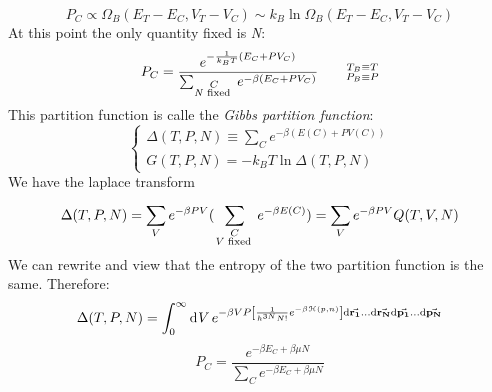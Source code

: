 \documentclass[../main/main.tex]{subfiles}
\begin{document}
\begin{equation}
  P_C \propto \Omega _B (E_T-E_C, V_T-V_C) \sim k_B \ln{\Omega _B (E_T-E_C, V_T-V_C)}
  \label{eq:}
\end{equation}
At this point the only quantity fixed is \emph{N}:
\begin{equation}
  P_C = \frac{e^{-\frac{1}{k_B T} (E_C + P V_C)} }{\sum_{\substack{ C \\  \text{\emph{N} fixed } } }^{} e^{-\beta (E_C + P V_C)}   } \qquad \substack{T_B \equiv T \\ P_B \equiv P}
  \label{eq:}
\end{equation}
This partition function is calle the \emph{Gibbs partition function}:
\begin{equation}
  \begin{cases}
   \Delta (T,P,N) \equiv \sum_{C}^{} e^{-\beta (E(C) + P V(C))}   \\
   G(T,P,N) = -k_B T \ln{\Delta (T,P,N)}
  \end{cases}
\label{eq:}
\end{equation}
We have the laplace transform
\begin{equation}
  \Delta (T,P,N) = \sum_{V}^{} e^{-\beta P V} (\sum_{\substack{ C \\  \text{\emph{V} fixed } } }^{} e^{-\beta E(C)}  )  = \sum_{V}^{} e^{-\beta P V} Q(T,V,N)
  \label{eq:}
\end{equation}
We can rewrite and view that the entropy of the two partition function is the same. Therefore:
\begin{equation}
  \Delta (T,P,N) = \int_{0}^{\infty } \dd[]{V}  e^{-\beta V P \qty[\frac{1}{h^{3N} N!} e^{-\beta \mathcal{H} (p,n)} ] \dd{\va{r_1} } \dots \dd{\va{r_N} } \dd{\va{p_1} } \dots \dd{\va{p_N} } }
  \label{eq:}
\end{equation}
\begin{equation}
  P_C = \frac{e^{-\beta E_C + \beta \mu N} }{ \sum_{C}^{} e^{-\beta E_C + \beta \mu N} }
  \label{eq:}
\end{equation}
\end{document}
